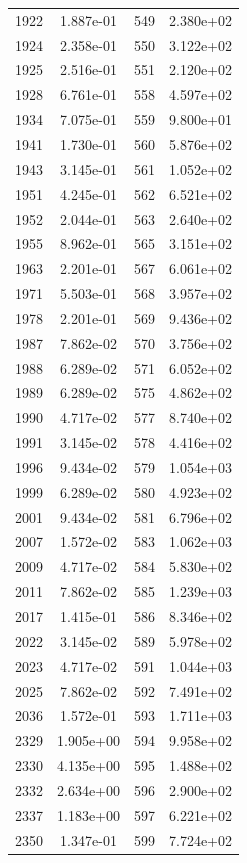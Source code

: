 \documentclass[12pt]{article}
\begin{document}
\begin{longtable}{@{}cccc@{}}
1922 & 1.887e-01 & 549 & 2.380e+02 \\
1924 & 2.358e-01 & 550 & 3.122e+02 \\
1925 & 2.516e-01 & 551 & 2.120e+02 \\
1928 & 6.761e-01 & 558 & 4.597e+02 \\
1934 & 7.075e-01 & 559 & 9.800e+01 \\
1941 & 1.730e-01 & 560 & 5.876e+02 \\
1943 & 3.145e-01 & 561 & 1.052e+02 \\
1951 & 4.245e-01 & 562 & 6.521e+02 \\
1952 & 2.044e-01 & 563 & 2.640e+02 \\
1955 & 8.962e-01 & 565 & 3.151e+02 \\
1963 & 2.201e-01 & 567 & 6.061e+02 \\
1971 & 5.503e-01 & 568 & 3.957e+02 \\
1978 & 2.201e-01 & 569 & 9.436e+02 \\
1987 & 7.862e-02 & 570 & 3.756e+02 \\
1988 & 6.289e-02 & 571 & 6.052e+02 \\
1989 & 6.289e-02 & 575 & 4.862e+02 \\
1990 & 4.717e-02 & 577 & 8.740e+02 \\
1991 & 3.145e-02 & 578 & 4.416e+02 \\
1996 & 9.434e-02 & 579 & 1.054e+03 \\
1999 & 6.289e-02 & 580 & 4.923e+02 \\
2001 & 9.434e-02 & 581 & 6.796e+02 \\
2007 & 1.572e-02 & 583 & 1.062e+03 \\
2009 & 4.717e-02 & 584 & 5.830e+02 \\
2011 & 7.862e-02 & 585 & 1.239e+03 \\
2017 & 1.415e-01 & 586 & 8.346e+02 \\
2022 & 3.145e-02 & 589 & 5.978e+02 \\
2023 & 4.717e-02 & 591 & 1.044e+03 \\
2025 & 7.862e-02 & 592 & 7.491e+02 \\
2036 & 1.572e-01 & 593 & 1.711e+03 \\
2329 & 1.905e+00 & 594 & 9.958e+02 \\
2330 & 4.135e+00 & 595 & 1.488e+02 \\
2332 & 2.634e+00 & 596 & 2.900e+02 \\
2337 & 1.183e+00 & 597 & 6.221e+02 \\
2350 & 1.347e-01 & 599 & 7.724e+02 \\

\end{longtable}
\end{document}
